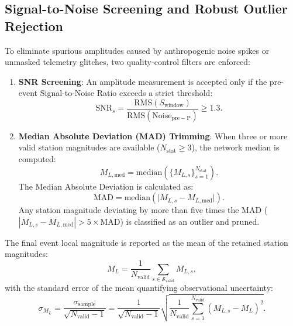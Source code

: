 \subsection{Signal-to-Noise Screening and Robust Outlier Rejection}
To eliminate spurious amplitudes caused by anthropogenic noise spikes or unmasked telemetry glitches, two quality-control filters are enforced:
\begin{enumerate}
  \item \textbf{SNR Screening}: An amplitude measurement is accepted only if the pre-event Signal-to-Noise Ratio exceeds a strict threshold:
  \begin{equation}
    \mathrm{SNR}_s = \frac{\mathrm{RMS}(S_{\mathrm{window}})}{\mathrm{RMS}(\mathrm{Noise}_{\mathrm{pre-P}})} \ge 1.3.
  \end{equation}
  \item \textbf{Median Absolute Deviation (MAD) Trimming}: When three or more valid station magnitudes are available ($N_{\mathrm{stat}} \ge 3$), the network median is computed:
  \begin{equation}
    M_{L, \mathrm{med}} = \mathrm{median}\left(\{M_{L, s}\}_{s=1}^{N_{\mathrm{stat}}}\right).
  \end{equation}
  The Median Absolute Deviation is calculated as:
  \begin{equation}
    \mathrm{MAD} = \mathrm{median}\left( \Big| M_{L, s} - M_{L, \mathrm{med}} \Big| \right).
  \end{equation}
  Any station magnitude deviating by more than five times the MAD ($|M_{L, s} - M_{L, \mathrm{med}}| > 5 \times \mathrm{MAD}$) is classified as an outlier and pruned.
\end{enumerate}

The final event local magnitude is reported as the mean of the retained station magnitudes:
\begin{equation}
  M_L = \frac{1}{N_{\mathrm{valid}}} \sum_{s \in \mathcal{S}_{\mathrm{valid}}} M_{L, s},
\end{equation}
with the standard error of the mean quantifying observational uncertainty:
\begin{equation}
  \sigma_{M_L} = \frac{\sigma_{\mathrm{sample}}}{\sqrt{N_{\mathrm{valid}} - 1}} = \frac{1}{\sqrt{N_{\mathrm{valid}} - 1}} \sqrt{\frac{1}{N_{\mathrm{valid}}} \sum_{s=1}^{N_{\mathrm{valid}}} \left(M_{L, s} - M_L\right)^2}.
\end{equation}

